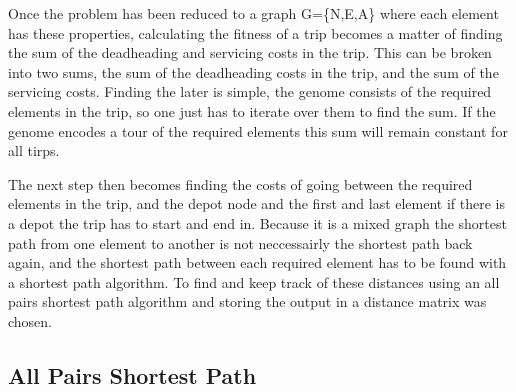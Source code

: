 Once the problem has been reduced to a graph G=\{N,E,A\} where each element has these properties, calculating the fitness of a trip becomes a matter of finding the sum of the deadheading and servicing costs in the trip. This can be broken into two sums, the sum of the deadheading costs in the trip, and the sum of the servicing costs. Finding the later is simple, the genome consists of the required elements in the trip, so one just has to iterate over them to find the sum. If the genome encodes a tour of the required elements this sum will remain constant for all tirps.

The next step then becomes finding the costs of going between the required elements in the trip, and the depot node and the first and last element if there is a depot the trip has to start and end in. Because it is a mixed graph the shortest path from one element to another is not neccessairly the shortest path back again, and the shortest path between each required element has to be found with a shortest path algorithm. To find and keep track of these distances using an all pairs shortest path algorithm and storing the output in a distance matrix was chosen.


\subsection{All Pairs Shortest Path} %
\label{sub:all_pairs_shortest_path}


